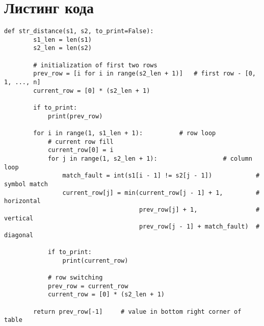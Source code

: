﻿\documentclass[12pt]{report}
\begin{document}
   \section{Листинг кода}
	\begin{lstlisting}[label=some-code,caption=Расстояние Левенштейна (матрично)]
	def str_distance(s1, s2, to_print=False):
	    s1_len = len(s1)
	    s2_len = len(s2)
	
	    # initialization of first two rows
	    prev_row = [i for i in range(s2_len + 1)]   # first row - [0, 1, ..., n]
	    current_row = [0] * (s2_len + 1)
	
	    if to_print:
	        print(prev_row)
	
	    for i in range(1, s1_len + 1):          # row loop
	        # current row fill
	        current_row[0] = i
	        for j in range(1, s2_len + 1):                  # column loop
	            match_fault = int(s1[i - 1] != s2[j - 1])            # symbol match
	            current_row[j] = min(current_row[j - 1] + 1,         # horizontal
	                                 prev_row[j] + 1,                # vertical
	                                 prev_row[j - 1] + match_fault)  # diagonal
	
	        if to_print:
	            print(current_row)
	
	        # row switching
	        prev_row = current_row
	        current_row = [0] * (s2_len + 1)
	
	    return prev_row[-1]     # value in bottom right corner of table
	\end{lstlisting}
\end{document}
